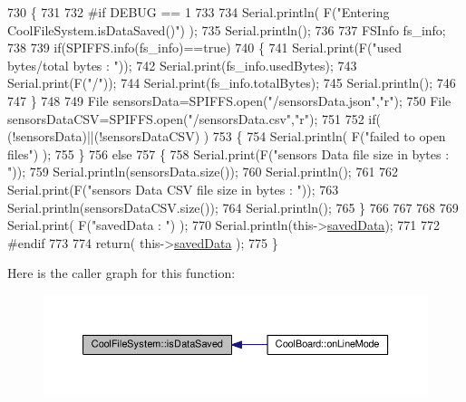 \begin{DoxyCode}
730 \{
731 
732 \textcolor{preprocessor}{#if DEBUG == 1 }
733 
734     Serial.println( F(\textcolor{stringliteral}{"Entering CoolFileSystem.isDataSaved()"}) );
735     Serial.println();
736 
737     FSInfo fs\_info;
738 
739     \textcolor{keywordflow}{if}(SPIFFS.info(fs\_info)==\textcolor{keyword}{true})
740     \{
741         Serial.print(F(\textcolor{stringliteral}{"used bytes/total bytes : "}));   
742         Serial.print(fs\_info.usedBytes);
743         Serial.print(F(\textcolor{stringliteral}{"/"}));
744         Serial.print(fs\_info.totalBytes);
745         Serial.println();
746 
747     \}
748 
749     File sensorsData=SPIFFS.open(\textcolor{stringliteral}{"/sensorsData.json"},\textcolor{stringliteral}{"r"});
750     File sensorsDataCSV=SPIFFS.open(\textcolor{stringliteral}{"/sensorsData.csv"},\textcolor{stringliteral}{"r"});
751     
752     \textcolor{keywordflow}{if}( (!sensorsData)||(!sensorsDataCSV) ) 
753     \{
754         Serial.println( F(\textcolor{stringliteral}{"failed to open files"}) );        
755     \}
756     \textcolor{keywordflow}{else}
757     \{       
758             Serial.print(F(\textcolor{stringliteral}{"sensors Data file size in bytes : "}));
759             Serial.println(sensorsData.size());
760             Serial.println();
761             
762             Serial.print(F(\textcolor{stringliteral}{"sensors Data CSV file size in bytes : "}));              
763             Serial.println(sensorsDataCSV.size());
764             Serial.println();
765     \}
766 
767 
768 
769     Serial.print( F(\textcolor{stringliteral}{"savedData : "}) );
770     Serial.println(this->\hyperlink{class_cool_file_system_ad9f5b739a32100f5f21270c3d9ee2b1d}{savedData});
771 
772 \textcolor{preprocessor}{#endif}
773 
774     \textcolor{keywordflow}{return}( this->\hyperlink{class_cool_file_system_ad9f5b739a32100f5f21270c3d9ee2b1d}{savedData} );
775 \}
\end{DoxyCode}
Here is the caller graph for this function\+:
\nopagebreak
\begin{figure}[H]
\begin{center}
\leavevmode
\includegraphics[width=350pt]{db/d0c/class_cool_file_system_ac86a40e7c3a1842f7342f698d34324f9_icgraph}
\end{center}
\end{figure}
\mbox{\label{class_cool_file_system_afa3a4feae94871d4d3b6bebb701c2e67}} 

